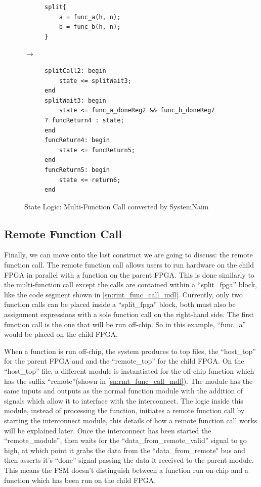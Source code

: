 \begin{figure}[H]
\centering
\begin{subfigure}{0.32\textwidth}
    \centering
    \begin{verbatim}
split{
    a = func_a(h, n);
    b = func_b(h, n);
}
\end{verbatim}
\end{subfigure}%
{\LARGE$\rightarrow$}%
\begin{subfigure}{0.58\textwidth}
    \begin{verbatim}
splitCall2: begin
    state <= splitWait3;
end
splitWait3: begin
    state <= func_a_doneReg2 && func_b_doneReg7 ? funcReturn4 : state;
end
funcReturn4: begin
    state <= funcReturn5;
end
funcReturn5: begin
    state <= return6;
end
    \end{verbatim}
\end{subfigure}
\caption{State Logic: Multi-Function Call converted by SystemNaim}
\label{sn:multi_func_call_state}
\end{figure}

\subsection{Remote Function Call}


Finally, we can move onto the last construct we are going to discuss: the remote function call. The remote function call allows users to run hardware on the child FPGA in parallel with a function on the parent FPGA. This is done similarly to the multi-function call except the calls are contained within a “split\_fpga” block, like the code segment shown in \autoref{sn:rmt_func_call_mdl}. Currently, only two function calls can be placed inside a “split\_fpga” block, both must also be assignment expressions with a sole function call on the right-hand side. The first function call is the one that will be run off-chip. So in this example, “func\_a” would be placed on the child FPGA.

When a function is run off-chip, the system produces to top files, the “host\_top” for the parent FPGA and and the “remote\_top” for the child FPGA. On the “host\_top” file, a different module is instantiated for the off-chip function which has the suffix “remote”(shown in \autoref{sn:rmt_func_call_mdl}). The module has the same inputs and outputs as the normal function module with the addition of signals which allow it to interface with the interconnect. The logic inside this module, instead of processing the function, initiates a remote function call by starting the interconnect module, this details of how a remote function call works will be explained later. Once the interconnect has been started the “remote\_module”, then waits for the “data\_from\_remote\_valid” signal to go high, at which point it grabs the data from the “data\_from\_remote" bus and then asserts it's “done” signal passing the data it received to the parent module. This means the FSM doesn't distinguish between a function run on-chip and a function which has been run on the child FPGA.

